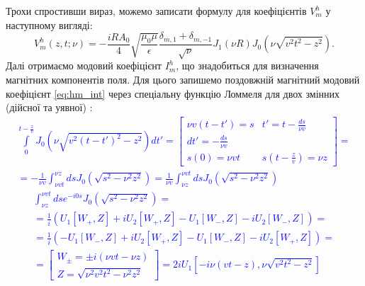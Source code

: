 Трохи спростивши вираз, можемо записати формулу для коефіцієнтів $ V_m^h $
у наступному вигляді:
%
\begin{equation} \label{eq:vmh}
V_m^h (z, t; \nu) = - \frac{iR A_0}{4} \sqrt{\frac{\mu_0 \mu}{\epsilon}} 
\frac{\delta_{m,1} + \delta_{m,-1}}{\sqrt{\nu}} J_1 (\nu R)
J_0 \left( \nu \sqrt{\mathit{v}^2 t^2 - z^2} \right).
\end{equation}
%
Далі отримаємо модовий коефіцієнт $ I_m^h $, що знадобиться для визначення
магнітних компонентів поля. Для цього запишемо поздовжній магнітний модовий
коефіцієнт \eqref{eq:hm_int} через спеціальну функцію Ломмеля для двох 
змінних (дійсної та уявної) \cite{imp:Boersma1961}:
%
\textcolor{blue} { \begin{equation*} \begin{aligned}
\int \limits_{0}^{t - \frac{z}{\mathit{v}}} 
J_0 \left( \nu \sqrt{\mathit{v}^2 (t-t')^2 - z^2} 
\right) dt' = \left[ \begin{array}{cc} 
\nu \mathit{v} (t-t') = s & t' = t - \frac{ds}{\nu \mathit{v}} \\
dt' = -\frac{ds}{\nu \mathit{v}} & \\
s(0) = \nu \mathit{v} t & s \left( t - \frac{z}{\mathit{v}} \right) = \nu z
\end{array} \right] = \\ = - \frac{1}{\nu \mathit{v}} 
\int_{\nu \mathit{v} t}^{\nu z} ds 
J_0 (\sqrt{s^2 - \nu^2 z^2}) = \frac{1}{\nu \mathit{v}} 
\int_{\nu z}^{\nu \mathit{v} t} ds
J_0 (\sqrt{s^2 - \nu^2 z^2})
\end{aligned} \end{equation*} }
%
\textcolor{blue} { \begin{equation*} \begin{aligned}
\int_{\nu z}^{\nu \mathit{v} t} ds e^{-i0s} J_0 (\sqrt{s^2 - \nu^2 z^2}) = \\ 
= \frac{1}{i} (U_1[W_+,Z] + i U_2[W_+,Z] - U_1[W_-,Z] - i U_2[W_-,Z]) = \\
= \frac{1}{i} (-U_1[W_-,Z] + i U_2[W_+,Z] - U_1[W_-,Z] - i U_2[W_+,Z]) = \\
= \left[ \begin{array}{c} W_\pm = \pm i (\nu \mathit{v} t - \nu z) \\
Z = \sqrt{\nu^2 \mathit{v}^2 t^2 - \nu^2 z^2} \end{array} \right] = 
2i U_1 \left[ -i \nu (\mathit{v}t-z), \nu \sqrt{\mathit{v}^2 t^2-z^2} \right]
\end{aligned} \end{equation*} }
